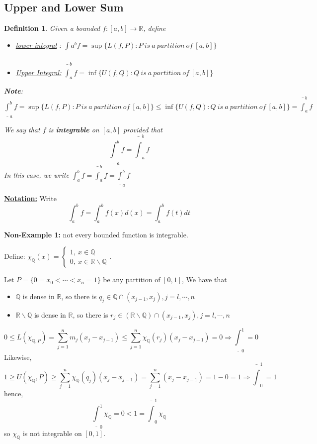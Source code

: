 \documentclass[12pt]{article}
\theoremstyle{plain}
\newtheorem{definition}{Definition}[subsection]
\begin{document}
	\newpage
	\subsection{Upper and Lower Sum}

	\begin{definition}
		Given a bounded $f:[a,b]\to\mathbb{R}$, define 
		\begin{itemize}
			\item \underline{lower integral} : 
				$\underline{\int} 
				a^b f = \sup \{L(f,P): P \ is\ a\ partition \ of \ [a,b]\}$
			\item \underline{Upper Integral:}
				$\bar{\int}_a^b f = \inf \{U(f,Q): Q\ is \ a \ partition
				\ of \ [a,b]\}$
		\end{itemize}
		\textbf{Note}:
		$\underline{\int}_a^b f
		=\sup \{L(f,P): P \ is\ a\ partition \ of \ [a,b]\}
		\leq \inf \{U(f,Q): Q\ is \ a \ partition \ of \ [a,b]\} 
		=\bar{\int}_a^b f$
	
		We say that $f$ is \textbf{integrable} on $[a,b]$ provided that 
		\[
			\underline{\int}_a^b f = \bar{\int}_a^b f
		\]
		In this case, we write $\int _a^b f =  \bar{\int}_a^b f
		=\underline{\int}_a^b f$
	\end{definition}

	\underline{\textbf{Notation:}} Write 
	\[
		\int_a^b f = \int _a^b f(x)d(x) = \int_a^b f(t) dt
	\]
	
	\vspace{0.5 in}
	{\color{Brown}
	\textbf{Non-Example 1: } not every bounded function is integrable. 
		
	Define: $\chi_{\mathbb{Q}}(x) = \begin{cases}
		1, \ x\in \mathbb{Q}\\
		0, \ x\in \mathbb{R}\backslash \mathbb{Q}
	\end{cases}$.
	
	Let $P=\{0=x_0<\cdots<x_n=1\}$ be any partition of $[0,1]$, 
	We have that 
	\begin{itemize}
		\item $\mathbb{Q}$ is dense in $\mathbb{R}$, so there is 
			 $q_j\in  \mathbb{Q} \cap(x_{j-1},x_j), j = l,\cdots, n$

		\item $\mathbb{R} \backslash \mathbb{Q}$ is dense in $\mathbb{R}$, 
			so there is $r_j\in (\mathbb{R}\backslash \mathbb{Q})
			\cap(x_{j-1},x_j), j = l,\cdots, n$
	\end{itemize}
	\[
		0\leq L(\chi_{\mathbb{Q},P}) = \sum_{j=1}^n m_j(x_j-x_{j-1})\leq 
		\sum_{j=1}^n \chi_{\mathbb{Q}}(r_j)(x_j-x_{j-1})=0
		\Rightarrow \underline{\int}_0^1 = 0
	\]
	Likewise, 
	\[
		1\geq U(\chi_{\mathbb{Q}},P)\geq \sum_{j=1}^n \chi_{\mathbb{Q}}(q_j)
		(x_j-x_{j-1}) =\sum_{j=1}^n (x_j-x_{j-1}) = 1-0=1 
		\Rightarrow \bar{\int}_0^1 = 1
	\]
	hence, 
	\[
		\underline{\int}_0^1 \chi_{\mathbb{Q}} = 0 < 1
		= \bar{\int}_0^1 \chi_{\mathbb{Q}} 
	\]
	so $\chi_{\mathbb{Q}}$ is not integrable on $[0,1]$.
	}
\end{document}

